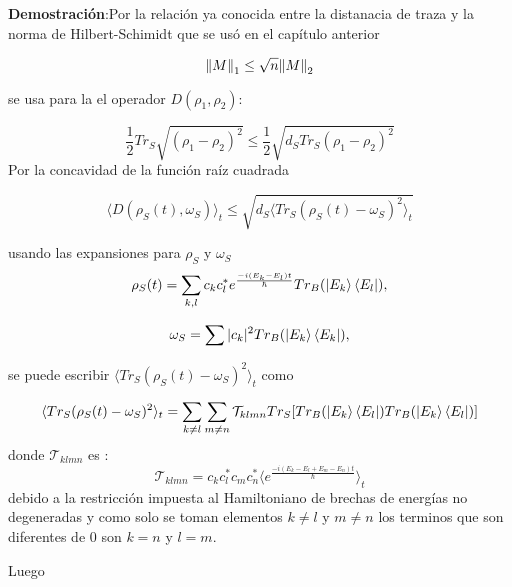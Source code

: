 \textbf{Demostración}:Por la relación ya conocida entre la distanacia de traza y la norma de Hilbert-Schimidt que se usó en el capítulo anterior

\begin{equation}
\norm{M}_{1} \le \sqrt{n}\norm{M}_{2}
\end{equation}

se usa para la el operador $D(\rho_{1}, \rho_{2})$:

\begin{equation}
\frac{1}{2} Tr_{S} \sqrt{(\rho_{1} - \rho_{2})^{2}} \le \frac{1}{2}\sqrt{d_{S} Tr_{S} (\rho_{1}- \rho_{2})^{2}}
\end{equation}
Por la concavidad de la función raíz cuadrada

\begin{equation}
\langle D(\rho_{S}(t),\omega_{S}) \rangle_{t} \le \sqrt{  d_{S} \Big \langle Tr_{S}(\rho_{S}(t)-\omega_{S})^{2} \Big \rangle_{t}}
\end{equation}

usando las expansiones para $\rho_{S}$ y $\omega_{S}$
\begin{equation}
\rho_{S}(t)=\sum_{k,l} c_{k} c_{l}^{*} e^{\frac{-i(E_{k}-E_{l})t}{\hbar}} Tr_{B} (\ket{E_{k}} \bra{E_{l}}),
\end{equation}

\begin{equation}
\omega_{S} = \sum |c_{k}|^{2} Tr_{B}(\ket{E_{k}} \bra{E_{k}}),
\end{equation}

se puede escribir $\langle Tr_{S}(\rho_{S}(t)-\omega_{S})^{2} \rangle_{t}$ como 

\begin{equation}
\langle Tr_{S}(\rho_{S}(t)-\omega_{S})^{2} \rangle_{t}=\sum_{k \neq l} \sum_{m \neq n} \mathcal{T}_{klmn} Tr_{S} [Tr_{B}(\ket{E_{k}} \bra{E_{l}}) Tr_{B}(\ket{E_{k}} \bra{E_{l}})]
\end{equation}
donde $\mathcal{T}_{klmn}$ es :
\begin{equation}
\mathcal{T}_{klmn}=c_{k}c_{l}^{*}c_{m}c_{n}^{*} \Big \langle e^{\frac{-i(E_{k}-E_{l}+E_{m}-E_{n})t}{\hbar}} \Big \rangle_{t}
\end{equation}
debido a la restricción impuesta al Hamiltoniano de brechas de energías no degeneradas y como solo se toman elementos $k \neq l$ y $m\neq n$ los terminos que son diferentes de $0$ son $k=n$ y $l=m$.

Luego
 
